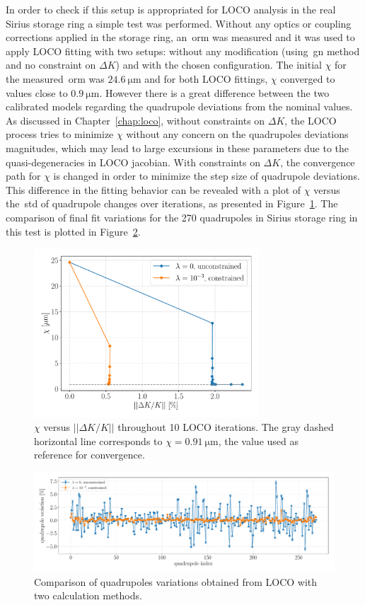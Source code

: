 In order to check if this setup is appropriated for LOCO analysis in the real Sirius storage ring a simple test was performed. Without any optics or coupling corrections applied in the storage ring, an~\gls{orm} was measured and it was used to apply LOCO fitting with two setups: without any modification (using~\gls{gn} method and no constraint on $\Delta K$) and with the chosen configuration. The initial $\chi$ for the measured~\gls{orm} was $\SI{24.6}{\micro\meter}$ and for both LOCO fittings, $\chi$ converged to values close to $\SI{0.9}{\micro\meter}$. However there is a great difference between the two calibrated models regarding the quadrupole deviations from the nominal values. As discussed in Chapter~\ref{chap:loco}, without constraints on $\Delta K$, the LOCO process tries to minimize $\chi$ without any concern on the quadrupoles deviations magnitudes, which may lead to large excursions in these parameters due to the quasi-degeneracies in LOCO jacobian. With constraints on $\Delta K$, the convergence path for $\chi$ is changed in order to minimize the step size of quadrupole deviations. This difference in the fitting behavior can be revealed with a plot of $\chi$ versus the~\gls{std} of quadrupole changes over iterations, as presented in Figure~\ref{fig:chi_vs_dkl}. The comparison of final fit variations for the 270 quadrupoles in Sirius storage ring in this test is plotted in Figure~\ref{fig:dkl_compare}. 
\begin{figure}
\centering
\includegraphics[width=0.75\textwidth]{figures/chi_versus_dk_cumsum.pdf}
\caption{$\chi$ versus $||\Delta K/K||$ throughout 10 LOCO iterations. The gray dashed horizontal line corresponds to $\chi = \SI{0.91}{\micro\meter}$, the value used as reference for convergence.}
\label{fig:chi_vs_dkl}
\end{figure}
\begin{figure}
\centering
\includegraphics[width=1.0\textwidth]{figures/delta_kl_comparison_better_grid.pdf}
\caption{Comparison of quadrupoles variations obtained from LOCO with two calculation methods.}
\label{fig:dkl_compare}
\end{figure}


